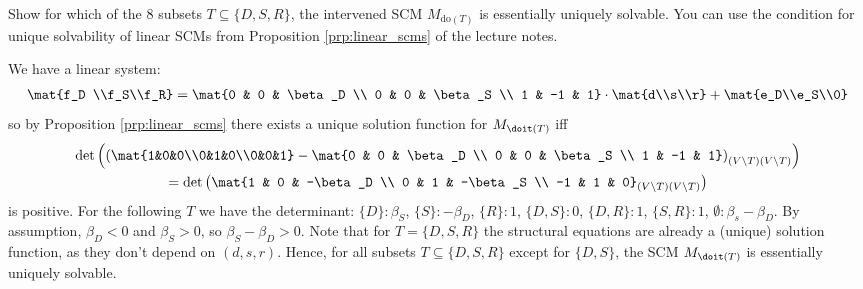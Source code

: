 \begin{enumerate}[label=11.\arabic*]
	Show for which of the 8 subsets $T \subseteq \{D, S, R\}$, the intervened SCM $M_{\text{do}(T)}$ is essentially uniquely solvable. You can use the condition for unique solvability of linear SCMs from Proposition \ref*{prp:linear_scms} of the lecture notes.
	\begin{ungradedsolution}
		We have a linear system:
		\begin{align*}
			\mat{f_D \\f_S\\f_R} = \mat{0 & 0 & \beta_D \\ 0 & 0 & \beta_S \\ 1 & -1 & 1}\cdot \mat{d\\s\\r}+\mat{e_D\\e_S\\0}
		\end{align*}
		so by Proposition \ref*{prp:linear_scms} there exists a unique solution function for $M_{\doit(T)}$ iff
		\begin{multline*}
			\det\left(\left(\mat{1&0&0\\0&1&0\\0&0&1} - \mat{0 & 0 & \beta_D \\ 0 & 0 & \beta_S \\ 1 & -1 & 1}\right)_{(V\setminus T)(V\setminus T)}\right) \\
			= \det\left(\mat{1 & 0 & -\beta_D \\ 0 & 1 & -\beta_S \\ -1 & 1 & 0}_{(V\setminus T)(V\setminus T)}\right)
		\end{multline*}
		is positive. For the following $T$ we have the determinant: $\{D\}: \beta_S$, $\{S\}:-\beta_D$, $\{R\}: 1$, $\{D, S\}: 0$, $\{D, R\}: 1$, $\{S, R\}: 1$, $\emptyset: \beta_s-\beta_D$. By assumption, $\beta_D < 0$ and $\beta_S> 0$, so $\beta_S-\beta_D > 0$. Note that for $T=\{D, S, R\}$ the structural equations are already a (unique) solution function, as they don't depend on $(d, s, r)$. Hence, for all subsets $T\subseteq\{D, S, R\}$ except for $\{D, S\}$, the SCM $M_{\doit(T)}$ is essentially uniquely solvable.
	\end{ungradedsolution}


\end{enumerate}
